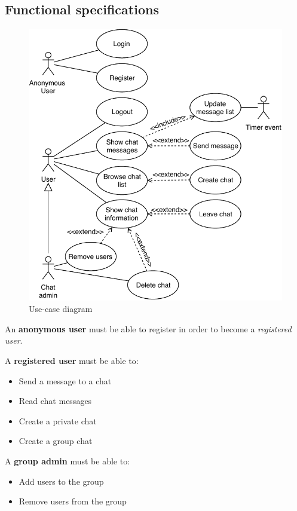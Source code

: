 \documentclass[10pt]{article}
\begin{document}
\subsection{Functional specifications}
\begin{figure}[]
    \centering
    \includegraphics[width=\textwidth]{figs/use_case_diagram}
    \caption{Use-case diagram}
    \label{fig:usecase}
\end{figure}

An \textbf{anonymous user} must be able to register in order to become a 
\emph{registered user}.

A \textbf{registered user} must be able to:
\begin{itemize}
    \item Send a message to a chat
    \item Read chat messages
    \item Create a private chat
    \item Create a group chat
\end{itemize}

A \textbf{group admin} must be able to:
\begin{itemize}
    \item Add users to the group
    \item Remove users from the group
\end{itemize}
\end{document}
